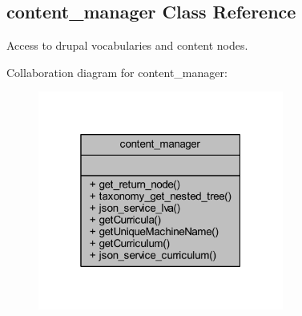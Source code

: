 \hypertarget{classcontent__manager}{\subsection{content\+\_\+manager Class Reference}
\label{classcontent__manager}
}


Access to drupal vocabularies and content nodes.  




Collaboration diagram for content\+\_\+manager\+:
\nopagebreak
\begin{figure}[H]
\begin{center}
\leavevmode
\includegraphics[width=229pt]{classcontent__manager__coll__graph}
\end{center}
\end{figure}
